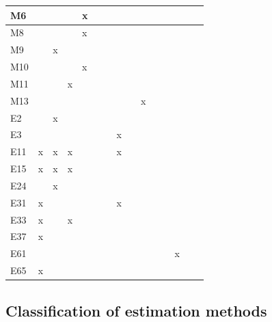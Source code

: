 \begin{landscape}
\begin{longtable}{|p{0.2in}|p{0.3in}|p{0.41in}|p{0.4in}|p{0.3in}|p{0.31in}|p{0.3in}|p{0.3in}|p{0.375in}|p{0.3in}|p{0.3in}|p{0.35in}|p{0.35in}|p{0.4in}|p{0.3in}|}
    M6 &  &  &  & x &  &  &  &  &  &  &  &  &  &  \\  \hline
    M8 &  &  &  & x &  &  &  &  &  &  &  &  &  &  \\  \hline
    M9 &  & x &  &  &  &  &  &  &  &  &  &  &  &  \\  \hline
    M10 &  &  &  & x &  &  &  &  &  &  &  &  &  &  \\  \hline
    M11 &  &  & x &  &  &  &  &  &  &  &  &  &  &  \\  \hline
    M13 &  &  &  &  &  &  &  &  & x &  &  &  &  &  \\  \hline
    E2 &  & x &  &  &  &  &  &  &  &  &  &  &  &  \\  \hline
    E3 &  &  &  &  &  &  & x &  &  &  &  &  &  &  \\  \hline
    E11 & x & x & x &  &  &  & x &  &  &  &  &  &  &  \\  \hline
    E15 & x & x & x &  &  &  &  &  &  &  &  &  &  &  \\  \hline
    E24 &  & x &  &  &  &  &  &  &  &  &  &  &  &  \\  \hline
    E31 & x &  &  &  &  &  & x &  &  &  &  &  &  &  \\  \hline
    E33 & x &  & x &  &  &  &  &  &  &  &  &  &  &  \\  \hline
    E37 & x &  &  &  &  &  &  &  &  &  &  &  &  &  \\  \hline
    E61 &  &  &  &  &  &  &  &  &  &  &  & x &  &  \\  \hline
    E65 & x &  &  &  &  &  &  &  &  &  &  &  &  &  \\ 
   \hline

\end{longtable}



\subsection{Classification of estimation methods}

    

\end{landscape}
